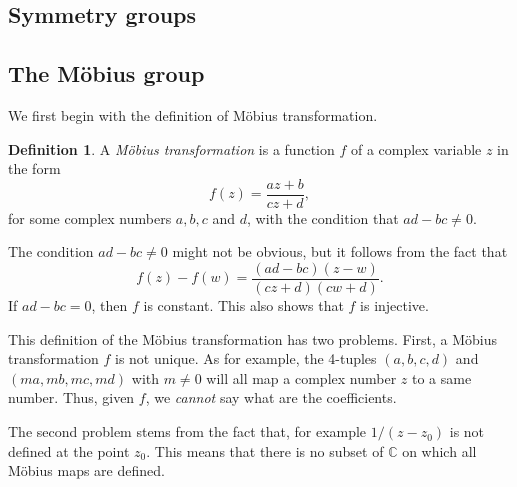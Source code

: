 \documentclass[12pt]{book}
\newcommand{\CC}{\mathbb C}
\theoremstyle{definition}
\newtheorem{definition}{Definition}[section]
\theoremstyle{remark}
\begin{document}
			
	\subsection{Symmetry groups}
		
	\subsection{The M\"obius group}
		We first begin with the definition of M\"obius transformation.
		\begin{definition}
			A \textit{M\"obius transformation} is a function $f$ of a complex variable $z$ in the form
			\begin{equation*}
				f(z) = \frac{az + b}{cz + d},
			\end{equation*}
			for some complex numbers $a, b, c$ and $d$, with the condition that $ad - bc \neq 0$.
		\end{definition}
		The condition $ad - bc \neq 0$ might not be obvious, but it follows from the fact that
		\begin{equation*}
			f(z) - f(w) = \frac{(ad - bc)(z - w)}{(cz+d)(cw + d)}.
		\end{equation*}
		If $ad - bc = 0$, then $f$ is constant. This also shows that $f$ is injective.
		
		This definition of the M\"obius transformation has two problems. First, a M\"obius transformation $f$ is not unique. As for example, the 4-tuples $(a,b,c,d)$ and $(ma, mb, mc, md)$ with $m \neq 0$ will all map a complex number $z$ to a same number. Thus, given $f$, we \textit{cannot} say what are the coefficients.
		
		The second problem stems from the fact that, for example $1/(z - z_0)$ is not defined at the point $z_0$. This means that there is no subset of $\CC$ on which all M\"obius maps are defined.
		
\end{document}
